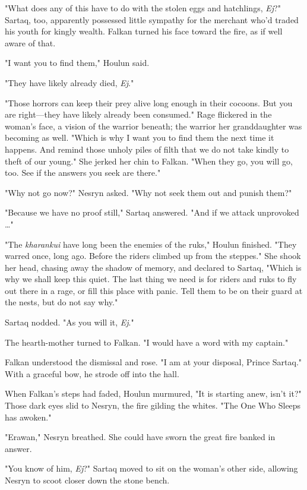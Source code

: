 "What does any of this have to do with the stolen eggs and hatchlings,
\emph{Ej}?"
Sartaq, too, apparently possessed little sympathy for the merchant who'd traded his youth for kingly wealth.
Falkan turned his face toward the fire, as if well aware of that.

"I want you to find them," Houlun said.

"They have likely already died, \emph{Ej}."

"Those horrors can keep their prey alive long enough in their cocoons.
But you are right---they have likely already been consumed."
Rage flickered in the woman's face, a vision of the warrior beneath; the warrior her granddaughter was becoming as well.
"Which is why I want you to find them the next time it happens.
And remind those unholy piles of filth that we do not take kindly to theft of our young."
She jerked her chin to Falkan.
"When they go, you will go, too.
See if the answers you seek are there."

"Why not go now?"
Nesryn asked.
"Why not seek them out and punish them?"

"Because we have no proof still," Sartaq answered.
"And if we attack unprovoked \ldots"

"The \emph{kharankui} have long been the enemies of the ruks," Houlun finished.
"They warred once, long ago.
Before the riders climbed up from the steppes."
She shook her head, chasing away the shadow of memory, and declared to Sartaq, "Which is why we shall keep this quiet.
The last thing we need is for riders and ruks to fly out there in a rage, or fill this place with panic.
Tell them to be on their guard at the nests, but do not say why."

Sartaq nodded.
"As you will it, \emph{Ej}."

The hearth-mother turned to Falkan.
"I would have a word with my captain."

Falkan understood the dismissal and rose.
"I am at your disposal, Prince Sartaq."
With a graceful bow, he strode off into the hall.

When Falkan's steps had faded, Houlun murmured, "It is starting anew, isn't it?"
Those dark eyes slid to Nesryn, the fire gilding the whites.
"The One Who Sleeps has awoken."

"Erawan," Nesryn breathed.
She could have sworn the great fire banked in answer.

"You know of him, \emph{Ej}?"
Sartaq moved to sit on the woman's other side, allowing Nesryn to scoot closer down the stone bench.

